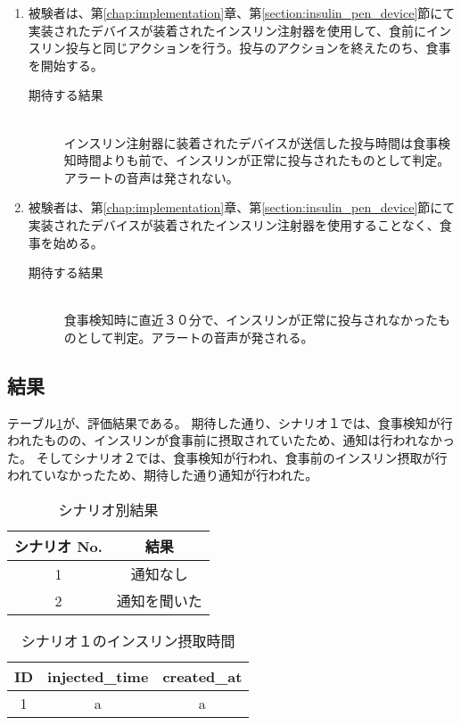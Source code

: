 \begin{enumerate}
  \item 被験者は、第\ref{chap:implementation}章、第\ref{section:insulin_pen_device}節にて実装されたデバイスが装着されたインスリン注射器を使用して、食前にインスリン投与と同じアクションを行う。投与のアクションを終えたのち、食事を開始する。
  \begin{description}
    \item[期待する結果]\mbox{}\\
      インスリン注射器に装着されたデバイスが送信した投与時間は食事検知時間よりも前で、インスリンが正常に投与されたものとして判定。アラートの音声は発されない。
  \end{description}
  \item 被験者は、第\ref{chap:implementation}章、第\ref{section:insulin_pen_device}節にて実装されたデバイスが装着されたインスリン注射器を使用することなく、食事を始める。
  \begin{description}
    \item[期待する結果]\mbox{}\\
      食事検知時に直近３０分で、インスリンが正常に投与されなかったものとして判定。アラートの音声が発される。
  \end{description}
\end{enumerate}

\subsection{結果}
テーブル\ref{tb:result_scenarios}が、評価結果である。
期待した通り、シナリオ１では、食事検知が行われたものの、インスリンが食事前に摂取されていたため、通知は行われなかった。
そしてシナリオ２では、食事検知が行われ、食事前のインスリン摂取が行われていなかったため、期待した通り通知が行われた。

\begin{table}[htbp]
  \caption{シナリオ別結果}
  \label{tb:result_scenarios}
  \begin{center}
    \begin{tabular}{|c||c|}
      \hline
      シナリオ No.  & 結果 \\
      \hline\hline
      1  & 通知なし \\\hline
      2 & 通知を聞いた \\\hline
    \end{tabular}
  \end{center}
\end{table}

\begin{table}[htbp]
  \caption{シナリオ１のインスリン摂取時間}
  \label{tb:scenario_1_insulin}
  \begin{center}
    \begin{tabular}{|c||c|c|}
      \hline
      ID  & injected\_time & created\_at \\
      \hline\hline
      1 & a & a \\\hline
    \end{tabular}
  \end{center}
\end{table}

